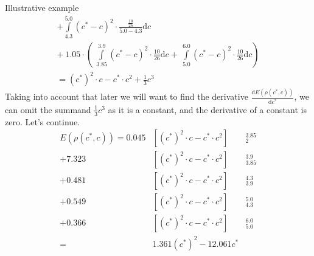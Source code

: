 \documentclass[11pt,a4paper]{article}
\numberwithin{equation}{subsection}
\begin{document}
\begin{subsection}{Illustrative example}
\begin{gather*}
+ \int\limits_{4.3}^{5.0} (c^{*}-c)^{2} \cdot \frac{\frac{10}{26}}{5.0-4.3} \mathrm{d}c \\
+ \ 1.05 \cdot \left( \ \int\limits_{3.85}^{3.9} (c^{*}-c)^{2} \cdot \frac{10}{26} \mathrm{d}c + \
\int\limits_{5.0}^{6.0} (c^{*}-c)^{2} \cdot \frac{10}{26} \mathrm{d}c \right) \\
=(c^{*})^{2} \cdot c - c^{*} \cdot c^{2} + \frac{1}{3} c^{3}
\end{gather*}
Taking into account that later we will want to find the derivative $\frac{\mathrm{d}E(\rho(c^{*},c))}{\mathrm{d}c^{*}}$, we can omit the summand $\frac{1}{3} c^{3}$ as it is a constant, and the derivative of a constant is zero. Let's continue.
\begin{eqnarray*}
E(\rho(c^{*},c)) = 0.045 &\left[ (c^{*})^{2} \cdot c - c^{*} \cdot c^{2} \right]&_{2}^{3.85}  \\
+ 7.323  &\left[ (c^{*})^{2} \cdot c - c^{*} \cdot c^{2} \right]&_{3.85}^{3.9} \\
+ 0.481 &\left[ (c^{*})^{2} \cdot c - c^{*} \cdot c^{2} \right]&_{3.9}^{4.3}  \\
+ 0.549 &\left[ (c^{*})^{2} \cdot c - c^{*} \cdot c^{2} \right]&_{4.3}^{5.0}  \\
+ 0.366 &\left[ (c^{*})^{2} \cdot c - c^{*} \cdot c^{2} \right]&_{5.0}^{6.0}  \\
= &1.361(c^{*})^{2}-12.061c^{*}&
\end{eqnarray*}


\end{subsection}
\end{document}
